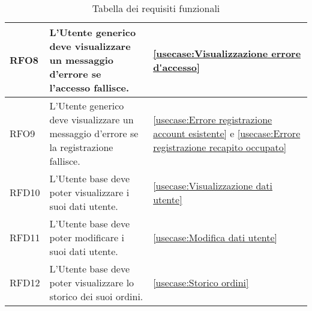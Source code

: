 \begin{table}[H]
\begin{tabularx}{\textwidth}{l|X|p{2cm}}
		\hline
		RFO8        & L'Utente generico deve visualizzare un messaggio d'errore se l'accesso fallisce.                           & \autoref{usecase:Visualizzazione errore d'accesso}                                                                                                           \\
		\hline
		RFO9        & L'Utente generico deve visualizzare un messaggio d'errore se la registrazione fallisce.                    & \autoref{usecase:Errore registrazione account esistente} e \autoref{usecase:Errore registrazione recapito occupato}                                          \\
		\hline
		RFD10       & L'Utente base deve poter visualizzare i suoi dati utente.                                                  & \autoref{usecase:Visualizzazione dati utente}                                                                                                                \\
		\hline
		RFD11       & L'Utente base deve poter modificare i suoi dati utente.                                                    & \autoref{usecase:Modifica dati utente}                                                                                                                       \\
		\hline
		RFD12       & L'Utente base deve poter visualizzare lo storico dei suoi ordini.                                          & \autoref{usecase:Storico ordini}                                                                                                                             \\
	\end{tabularx}
	\caption{Tabella dei requisiti funzionali}
\end{table}

